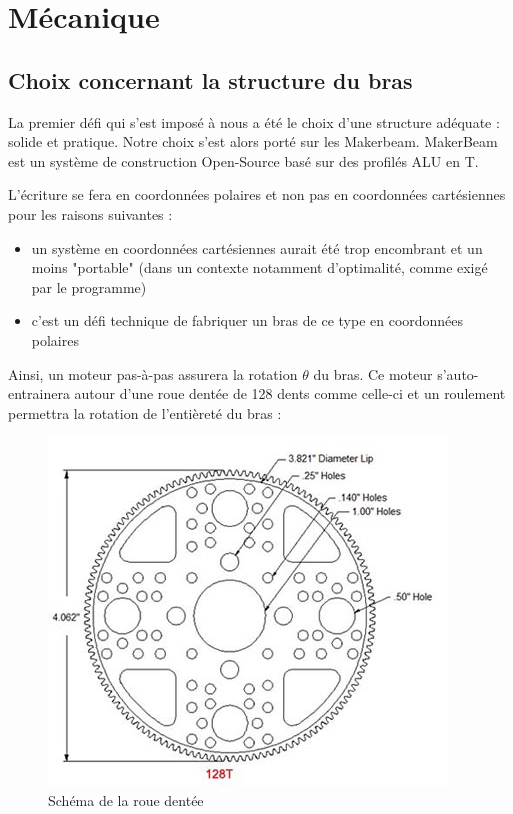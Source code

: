 \documentclass[12pt,a4paper]{report}
\begin{document}
	\chapter{Mécanique}
	\section{Choix concernant la structure du bras}
	La premier défi qui s'est imposé à nous a été le choix d'une structure adéquate : solide et pratique. Notre choix s'est alors porté sur les Makerbeam. MakerBeam est un système de construction Open-Source basé sur des profilés ALU en T.
	
	L'écriture se fera en coordonnées polaires et non pas en coordonnées cartésiennes pour les raisons suivantes :
	\begin{itemize}[label=--]
	\item un système en coordonnées cartésiennes aurait été trop encombrant et un moins "portable" (dans un contexte notamment d'optimalité, comme exigé par le programme)
	\item c'est un défi technique de fabriquer un bras de ce type en coordonnées polaires
	\end{itemize}
	
Ainsi, un moteur pas-à-pas assurera la rotation $\theta$ du bras. Ce moteur s'auto-entrainera autour d'une roue dentée de 128 dents comme celle-ci et un roulement permettra la rotation de l'entièreté du bras :

\begin{figure}[!h]
 \center
 \includegraphics[scale=0.5]{../pictures/rouedentee2.jpg}
 \caption{Schéma de la roue dentée}
\end{figure}
\end{document}
